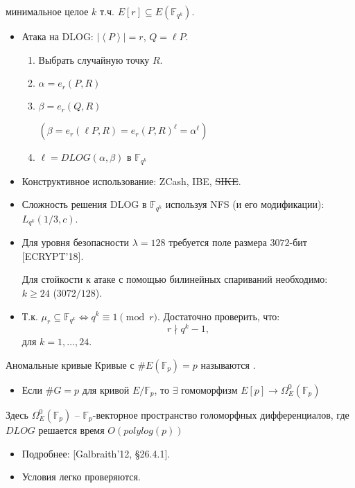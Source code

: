 \documentclass{beamer}
\begin{document}
\begin{frame}
     минимальное целое $k$ т.ч. $E[r] \subseteq E(\mathbb{F}_{q^k})$.
    
    \begin{itemize}
        \item Атака на DLOG: $\mid\left<P\right>\mid = r$, $Q = \ell P$.
        \begin{enumerate}
            \item Выбрать случайную точку $R$.
            \item $\alpha = e_r(P, R)$
            \item $\beta  = e_r(Q, R)$ \hfill 
            \begin{scriptsize}
                $(\beta = e_r(\ell P, R) = e_r(P, R)^\ell = \alpha^\ell)$
            \end{scriptsize}
            \item $\ell = DLOG(\alpha, \beta)$ в $\mathbb{F}_{q^k}$
        \end{enumerate}    
        \item Конструктивное использование: ZCash, IBE, \st{SIKE}.
    \end{itemize}
\end{frame}

\begin{frame}
\begin{itemize}
    \item Сложность решения DLOG в $\mathbb{F}_{q^k}$ используя
NFS (и его модификации): $L_{q^k}(1/3, c)$.
    \item Для уровня безопасности $\lambda = 128$ требуется поле размера $3072$-бит [ECRYPT'18].
    
    \begin{center}
        \structure{$\Downarrow$}
    \end{center}

    Для стойкости к атаке с помощью билинейных спариваний необходимо: $k \geq 24$ ($3072/128$).
    \item Т.к. $\mu_r \subseteq \mathbb{F}_{q^k} \iff q^k \equiv 1 \pmod{r}$. Достаточно проверить, что:
    \[
    r \nmid q^k - 1, 
    \]
    для $k = 1, \ldots, 24$.
\end{itemize}
\end{frame}

\begin{frame}{Аномальные кривые}
Кривые с $\#E(\mathbb{F}_p) = p$ называются .
\begin{itemize}
    \item Если $\#G = p$ для кривой $E/\mathbb{F}_p$, то $\exists$ гомоморфизм $E[p] \rightarrow \Omega^0_E(\mathbb{F}_p)$
\end{itemize}
Здесь $\Omega^0_E(\mathbb{F}_p)$ -- $\mathbb{F}_p$-векторное пространство голоморфных дифференциалов, где $DLOG$ решается время $O(polylog(p))$
\begin{itemize}
    \item Подробнее: [Galbraith'12, \S26.4.1].
    \item Условия легко проверяются.
\end{itemize}
\end{frame}
\end{document}
